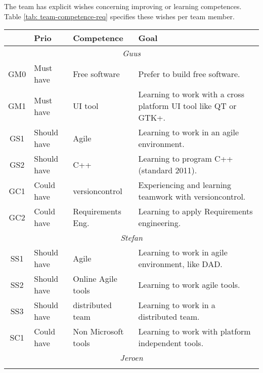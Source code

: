 
The team has explicit wishes concerning improving or learning competences. Table
\ref{tab: team-competence-req} specifies these wishes per team member.

\begin{center}
    \begin{tabular}{cllp{17em}}
        \hline
        & {\bf Prio} & {\bf Competence}    & {\bf Goal}\\
        \hline
        \multicolumn{4}{c}{\sf\emph{Guus}}\\
        \hline
		GM0 & Must have    & Free software & Prefer to build free software.\\
        GM1 & Must have    & UI tool       & Learning to work with a cross platform UI tool like QT or GTK+.\\
        GS1 & Should have  & Agile		   & Learning to work in an agile environment.\\
        GS2 & Should have  & C++		   & Learning to program C++ (standard 2011).\\
	GC1 & Could have   & versioncontrol	   & Experiencing and learning teamwork with versioncontrol.\\
        GC2 & Could have   & Requirements Eng.   & Learning to apply Requirements engineering.\\
        \hline
        \multicolumn{4}{c}{\sf\emph{Stefan}}\\
        \hline
        SS1 & Should have  & Agile		   & Learning to work in agile environment, like DAD.\\
        SS2 & Should have  & Online Agile tools  & Learning to work agile tools.\\
        SS3 & Should have  & distributed team    & Learning to work in a distributed team.\\
        SC1 & Could have   & Non Microsoft tools & Learning to work with platform independent tools.\\
        \hline
        \multicolumn{4}{c}{\sf\emph{Jeroen}}\\
        \hline
                     &                     & \\
        \hline
    \end{tabular}
    \label{tab: team-competence-req}
\end{center}
